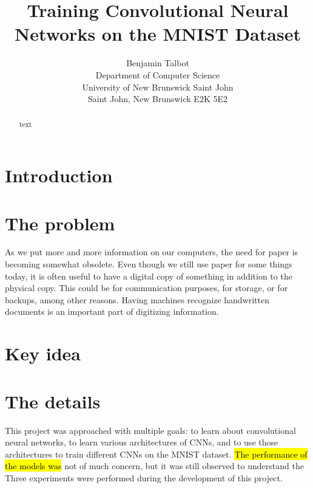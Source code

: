 \documentclass[12pt]{article}
\title{Training Convolutional Neural Networks on the MNIST Dataset}
\author{Benjamin Talbot \\
	Department of Computer Science\\
	University of New Brunswick Saint John\\
	Saint John, New Brunswick E2K 5E2\\
}
\begin{document}
\maketitle

\begin{abstract}
	text
\end{abstract}

\tableofcontents
\newpage



\section{Introduction}



\section{The problem}
As we put more and more information on our computers, the need for paper is becoming somewhat obsolete. Even though we still use paper for some things today, it is often useful to have a digital copy of something in addition to the physical copy. This could be for communication purposes, for storage, or for backups, among other reasons. Having machines recognize handwritten documents is an important part of digitizing information. 



\section{Key idea}


\section{The details}

This project was approached with multiple goals: to learn about convolutional neural networks, to learn various architectures of CNNs, and to use those architectures to train different CNNs on the MNIST dataset. \hl{The performance of the models was} not of much concern, but it was still observed to understand the 
Three experiments were performed during the development of this project. 
\end{document}

